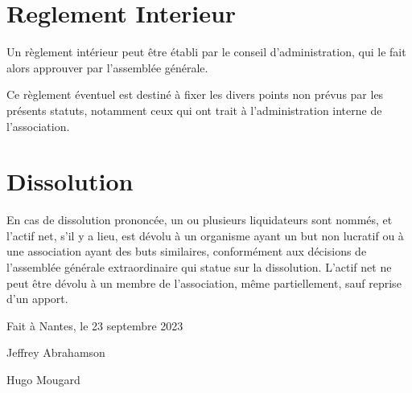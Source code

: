 \documentclass[11 pt]{article}
\begin{document}
\section{Reglement Interieur}

Un règlement intérieur peut être établi par le conseil
d'administration, qui le fait alors approuver par l'assemblée
générale.

Ce règlement éventuel est destiné à fixer les divers points non prévus
par les présents statuts, notamment ceux qui ont trait à
l'administration interne de l'association.

\section{Dissolution}

En cas de dissolution prononcée, un ou plusieurs liquidateurs sont
nommés, et l'actif net, s'il y a lieu, est dévolu à un organisme ayant
un but non lucratif ou à une association ayant des buts similaires,
conformément aux décisions de l’assemblée générale extraordinaire qui
statue sur la dissolution. L’actif net ne peut être dévolu à un membre
de l’association, même partiellement, sauf reprise d’un apport.


\vspace{5 mm}
Fait à Nantes, le 23 septembre 2023

\vspace{1 cm}
Jeffrey Abrahamson

\vspace{1 cm}
Hugo Mougard
\end{document}

